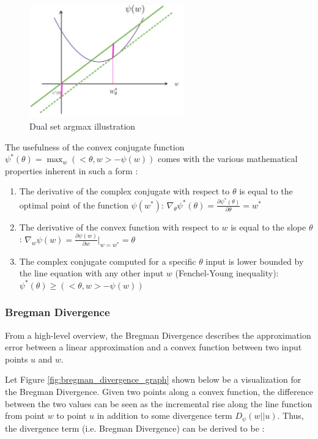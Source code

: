 \documentclass[11pt]{article}
\begin{document}
\begin{figure}[H]
    \centering
    \includegraphics[width=0.6\textwidth]{f3.jpg}
    \caption{Dual set argmax illustration}
    \label{fig:dual_set_argmax}
\end{figure}

The usefulness of the convex conjugate function $\psi^*(\theta) = \max_w (<\theta, w> - \psi(w))$ comes with the various mathematical properties inherent in such a form \cite{wiki:Convex_conjugate}: 

\begin{enumerate}
    \item The derivative of the complex conjugate with respect to $\theta$ is equal to the optimal point of the function $\psi(w^*)$: $\nabla_\theta \psi^*(\theta) = \frac{\partial \psi^*(\theta)}{\partial \theta} = w^*$
    \item The derivative of the convex function with respect to $w$ is equal to the slope $\theta$: $\nabla_w \psi(w) = \frac{\partial \psi(w)}{\partial w} |_{w=w^*} = \theta$
    \item The complex conjugate computed for a specific $\theta$ input is lower bounded by the line equation with any other input $w$ (Fenchel-Young inequality): $\psi^*(\theta) \geq (<\theta, w> - \psi(w))$
\end{enumerate}

\subsubsection{Bregman Divergence}

From a high-level overview, the Bregman Divergence describes the approximation error between a linear approximation and a convex function between two input points $u$ and $w$.

Let Figure \ref{fig:bregman_divergence_graph} shown below be a visualization for the Bregman Divergence. Given two points along a convex function, the difference between the two values can be seen as the incremental rise along the line function from point $w$ to point $u$ in addition to some divergence term $D_{\psi}(w||u)$. Thus, the divergence term (i.e. Bregman Divergence) can be derived to be \cite{wiki:Bregman_divergence}:
\end{document}
